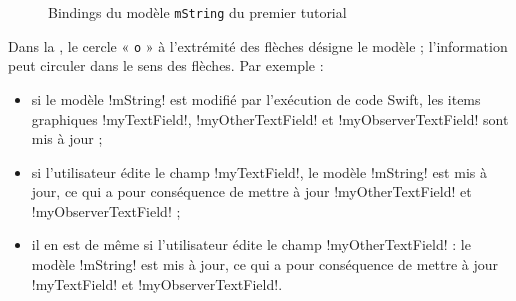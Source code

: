 \newcommand\FondModele{LightGray!25}

\newcommand\ProprieteStockee[4]{
  \SetVertexNormal[Shape=rectangle, LineColor=black, FillColor=\FondModele, LineWidth=1pt]
  \Vertex[x=#3, y=#4, L={\tt #2}]{#1}
}

\newcommand\ProprieteTransitoire[4]{
  \SetVertexNormal[Shape=rectangle, LineColor=green, FillColor=\FondModele, LineWidth=1pt]
  \Vertex[x=#3, y=#4, L={\tt #2}]{#1}
}

\newcommand\ItemGraphique[4]{
  \SetVertexNormal[Shape=rectangle, LineColor=blue, FillColor=\FondModele, LineWidth=1pt]
  \Vertex[x=#3, y=#4, L={\tt #2}]{#1}
}

\newcommand\Fleche[4]{
  \draw [#1, thick, black] (#2) edge[#4] (#3) ;
}

\begin{figure}[t]
  \centering
  \small
  \caption{Bindings du modèle \texttt{mString} du premier tutorial}
  \ligne
\end{figure}

Dans la , le cercle « \texttt{o} » à l'extrémité des flèches désigne le modèle ; l'information peut circuler dans le sens des flèches. Par exemple :
\begin{itemize}
  \item si le modèle \eb!mString! est modifié par l'exécution de code Swift, les items graphiques \eb!myTextField!, \eb!myOtherTextField! et \eb!myObserverTextField! sont mis à jour ;
  \item si l'utilisateur édite le champ \eb!myTextField!, le modèle \eb!mString! est mis à jour, ce qui a pour conséquence de mettre à jour \eb!myOtherTextField! et \eb!myObserverTextField! ;
  \item il en est de même si l'utilisateur édite le champ \eb!myOtherTextField! : le modèle \eb!mString! est mis à jour, ce qui a pour conséquence de mettre à jour \eb!myTextField! et \eb!myObserverTextField!.
\end{itemize}

